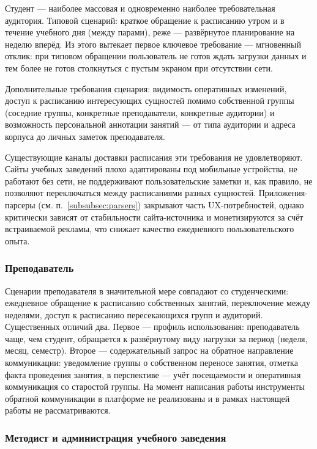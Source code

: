 Студент --- наиболее массовая и одновременно наиболее требовательная аудитория. Типовой сценарий: краткое обращение к расписанию утром и в течение учебного дня (между парами), реже --- развёрнутое планирование на неделю вперёд. Из этого вытекает первое ключевое требование --- мгновенный отклик: при типовом обращении пользователь не готов ждать загрузки данных и тем более не готов столкнуться с пустым экраном при отсутствии сети.

Дополнительные требования сценария: видимость оперативных изменений, доступ к расписанию интересующих сущностей помимо собственной группы (соседние группы, конкретные преподаватели, конкретные аудитории) и возможность персональной аннотации занятий --- от типа аудитории и адреса корпуса до личных заметок преподавателя.

Существующие каналы доставки расписания эти требования не удовлетворяют. Сайты учебных заведений плохо адаптированы под мобильные устройства, не работают без сети, не поддерживают пользовательские заметки и, как правило, не позволяют переключаться между расписаниями разных сущностей. Приложения-парсеры (см. п.~\ref{subsubsec:parsers}) закрывают часть UX-потребностей, однако критически зависят от стабильности сайта-источника и монетизируются за счёт встраиваемой рекламы, что снижает качество ежедневного пользовательского опыта.

\subsubsection{Преподаватель}

Сценарии преподавателя в значительной мере совпадают со студенческими: ежедневное обращение к расписанию собственных занятий, переключение между неделями, доступ к расписанию пересекающихся групп и аудиторий. Существенных отличий два. Первое --- профиль использования: преподаватель чаще, чем студент, обращается к развёрнутому виду нагрузки за период (неделя, месяц, семестр). Второе --- содержательный запрос на обратное направление коммуникации: уведомление группы о собственном переносе занятия, отметка факта проведения занятия, в перспективе --- учёт посещаемости и оперативная коммуникация со старостой группы. На момент написания работы инструменты обратной коммуникации в платформе не реализованы и в рамках настоящей работы не рассматриваются.

\subsubsection{Методист и администрация учебного заведения}

